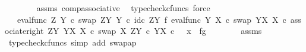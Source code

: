 \begin{isabellebody}
\ \ \ \ \ \ \isamarkupfalse%
\ assms\ comp{\isacharunderscore}{\kern0pt}associative{}\ \isamarkupfalse%
\ {\isacharparenleft}{\kern0pt}typecheck{\isacharunderscore}{\kern0pt}cfuncs{\isacharcomma}{\kern0pt}\ force{\isacharparenright}{\kern0pt}\isanewline
\ \ \ \ \isamarkupfalse%
\ \isamarkupfalse%
\ {\isachardoublequoteopen}{\isachardot}{\kern0pt}{\isachardot}{\kern0pt}{\isachardot}{\kern0pt}\ {\isacharequal}{\kern0pt}\ {\isacharparenleft}{\kern0pt}eval{\isacharunderscore}{\kern0pt}func\ Z\ Y\ {\isasymcirc}\isactrlsub c\ swap\ {\isacharparenleft}{\kern0pt}Z\isactrlbsup Y\isactrlesup {\isacharparenright}{\kern0pt}\ Y\ {\isasymcirc}\isactrlsub c\ {\isacharparenleft}{\kern0pt}id\isactrlsub c\ {\isacharparenleft}{\kern0pt}Z\isactrlbsup Y\isactrlesup {\isacharparenright}{\kern0pt}\ {\isasymtimes}\isactrlsub f\ eval{\isacharunderscore}{\kern0pt}func\ Y\ X\ {\isasymcirc}\isactrlsub c\ swap\ {\isacharparenleft}{\kern0pt}Y\isactrlbsup X\isactrlesup {\isacharparenright}{\kern0pt}\ X{\isacharparenright}{\kern0pt}\ {\isasymcirc}\isactrlsub c\ associate{\isacharunderscore}{\kern0pt}right\ {\isacharparenleft}{\kern0pt}Z\isactrlbsup Y\isactrlesup {\isacharparenright}{\kern0pt}\ {\isacharparenleft}{\kern0pt}Y\isactrlbsup X\isactrlesup {\isacharparenright}{\kern0pt}\ X{\isacharparenright}{\kern0pt}\ {\isasymcirc}\isactrlsub c\ swap\ X\ {\isacharparenleft}{\kern0pt}Z\isactrlbsup Y\isactrlesup \ {\isasymtimes}\isactrlsub c\ Y\isactrlbsup X\isactrlesup {\isacharparenright}{\kern0pt}\ {\isasymcirc}\isactrlsub c\ \ \ {\isasymlangle}x{\isacharcomma}{\kern0pt}\ \ {\isasymlangle}f{\isacharcomma}{\kern0pt}g{\isasymrangle}{\isasymrangle}{\isachardoublequoteclose}\isanewline
\ \ \ \ \ \ \isamarkupfalse%
\ assms\ \isamarkupfalse%
\ {\isacharparenleft}{\kern0pt}typecheck{\isacharunderscore}{\kern0pt}cfuncs{\isacharcomma}{\kern0pt}\ simp\ add{\isacharcolon}{\kern0pt}\ swap{\isacharunderscore}{\kern0pt}ap{\isacharparenright}{\kern0pt}\isanewline
\ \ \ \ \isamarkupfalse%
\ \isamarkupfalse%

\end{isabellebody}
